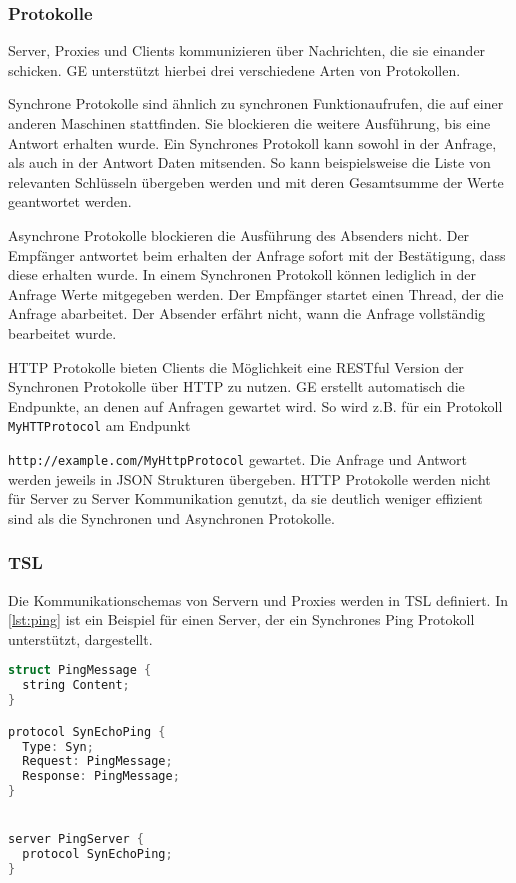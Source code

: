 \subsubsection{Protokolle}

Server, Proxies und Clients kommunizieren über Nachrichten, die sie einander schicken. GE unterstützt hierbei drei verschiedene Arten von Protokollen.


Synchrone Protokolle sind ähnlich zu synchronen Funktionaufrufen, die auf einer anderen Maschinen stattfinden. Sie blockieren die weitere Ausführung, bis
eine Antwort erhalten wurde. Ein Synchrones Protokoll kann sowohl in der Anfrage, als auch in der Antwort Daten mitsenden. So kann beispielsweise die Liste von
relevanten Schlüsseln übergeben werden und mit deren Gesamtsumme der Werte geantwortet werden.


Asynchrone Protokolle blockieren die Ausführung des Absenders nicht. Der Empfänger antwortet beim erhalten der Anfrage sofort mit der Bestätigung, dass diese erhalten wurde.
In einem Synchronen Protokoll können lediglich in der Anfrage Werte mitgegeben werden.
Der Empfänger startet einen Thread, der die Anfrage abarbeitet. Der Absender erfährt nicht, wann die Anfrage vollständig bearbeitet wurde.


HTTP Protokolle bieten Clients die Möglichkeit eine RESTful Version der Synchronen Protokolle über HTTP zu nutzen. GE erstellt automatisch die Endpunkte, an denen
auf Anfragen gewartet wird. So wird z.B. für ein Protokoll \verb|MyHTTProtocol| am Endpunkt

\verb|http://example.com/MyHttpProtocol| gewartet. Die Anfrage und
Antwort werden jeweils in JSON Strukturen übergeben. HTTP Protokolle werden nicht für Server zu Server Kommunikation genutzt, da sie deutlich weniger effizient sind als die
Synchronen und Asynchronen Protokolle.

\subsubsection{TSL}

Die Kommunikationschemas von Servern und Proxies werden in TSL definiert. In \ref{lst:ping} ist ein Beispiel für einen Server, der ein Synchrones Ping Protokoll unterstützt, dargestellt.

\begin{lstlisting}[language=c,label={lst:ping}, caption={In TSL definiertes Ping Protokoll}]
struct PingMessage {
  string Content;
}

protocol SynEchoPing {
  Type: Syn;
  Request: PingMessage;
  Response: PingMessage;
}


server PingServer {
  protocol SynEchoPing;
}
\end{lstlisting}

